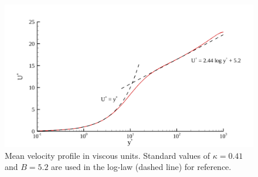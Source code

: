 \documentclass[11pt,letterpaper]{article}
\begin{document}
\begin{figure}[h]
  \centering
  \includegraphics[width=7.00in]{./figures/u.png}
  \caption{Mean velocity profile in viscous units. Standard values of $\kappa=0.41$ and $B=5.2$ are used in the log-law (dashed line) for reference.}
 \label{fig:u}
\end{figure}
\end{document}
